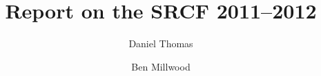 \documentclass[12pt,a4paper,twoside]{article}
\begin{document}
\title{Report on the SRCF 2011--2012}
\author{Daniel Thomas \and Ben Millwood}
\maketitle



\end{document}
